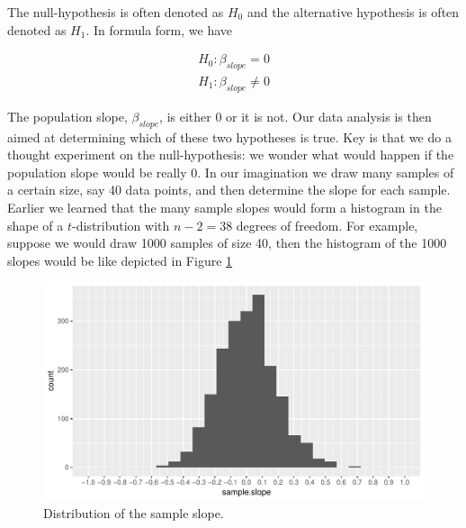 \documentclass[]{report}\usepackage[]{graphicx}\usepackage[]{color}
\makeatletter
\def\maxwidth{ %
  \ifdim\Gin@nat@width>\linewidth
    \linewidth
  \else
    \Gin@nat@width
  \fi
}
\newenvironment{knitrout}{}{} %
\makeatother
\begin{document}
The null-hypothesis is often denoted as $H_0$ and the alternative hypothesis is often denoted as $H_1$. In formula form, we have


\begin{eqnarray}
H_0: \beta_{slope}=0 \\
H_1: \beta_{slope} \neq 0
\end{eqnarray}

The population slope, $\beta_{slope}$, is either 0 or it is not. Our data analysis is then aimed at determining which of these two hypotheses is true. Key is that we do a thought experiment on the null-hypothesis: we wonder what would happen if the population slope would be really 0. In our imagination we draw many samples of a certain size, say 40 data points, and then determine the slope for each sample. Earlier we learned that the many sample slopes would form a histogram in the shape of a $t$-distribution with $n-2=38$ degrees of freedom. For example, suppose we would draw 1000 samples of size 40, then the histogram of the 1000 slopes would be like depicted in Figure \ref{fig:inf_14}

\begin{knitrout}
\color{fgcolor}\begin{figure}

{\centering \includegraphics[width=\maxwidth]{figure/inf_14-1} 

}

\caption[Distribution of the sample slope]{Distribution of the sample slope.}\label{fig:inf_14}
\end{figure}


\end{knitrout}
\end{document}
